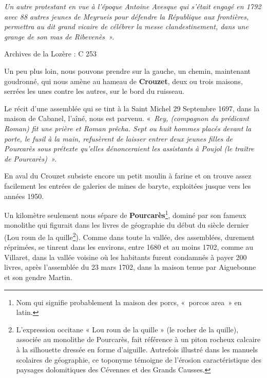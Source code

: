 \textit{Un autre protestant en vue à l’époque Antoine Avesque qui s’était engagé en 1792 avec 88
autres jeunes de Meyrueis pour défendre la République aux frontières, permettra au dit grand
vicaire de célébrer la messe clandestinement, dans une grange de son mas de Ribevenès~».}

\vspace{-10mm}

\begin{flushright}
    \item Archives de la Lozère : C 253
\end{flushright}

\vspace{5mm}

Un peu plus loin, nous pouvons prendre sur la gauche, un chemin, maintenant goudronné, qui
nous amène au hameau de \textbf{Crouzet}, deux ou trois maisons, serrées les unes contre les autres,
sur le bord du ruisseau.

Le récit d’une assemblée qui se tint à la Saint Michel 29 Septembre 1697, dans la maison de
Cabanel, l’aîné, nous est parvenu. «~\textit{Rey, (compagnon du prédicant Roman) fit une prière et
Roman prêcha. Sept ou huit hommes placés devant la porte, le fusil à la main, refusèrent de
laisser entrer deux jeunes filles de Pourcarès sous prétexte qu’elles dénonceraient les
assistants à Poujol (le traître de Pourcarès)~».}

En aval du Crouzet subsiste encore un petit moulin à farine et on trouve assez facilement les
entrées de galeries de mines de baryte, exploitées jusque vers les années 1950.

Un kilomètre seulement nous sépare de \textbf{Pourcarès}\footnote{Nom qui signifie probablement la maison
des porcs, «~porcos area~» en latin.}, dominé par son fameux monolithe qui figurait dans les
livres de géographie du début du siècle dernier (Lou roun de la quille\footnote{L'expression occitane « Lou roun de la quille » (le rocher de la quille), associée au monolithe de Pourcarès, fait référence à un piton rocheux calcaire à la silhouette dressée en forme d'aiguille. Autrefois illustré dans les manuels scolaires de géographie, ce toponyme témoigne de l'érosion caractéristique des paysages dolomitiques des Cévennes et des Grands Causses.}). Comme dans toute la
vallée, des assemblées, durement réprimées, se tinrent dans les environs, entre 1680 et au
moins 1702, comme au Villaret, dans la vallée voisine où les habitants furent condamnés à
payer 200 livres, après l’assemblée du 23 mars 1702, dans la maison tenue par Aiguebonne et
son gendre Martin.

